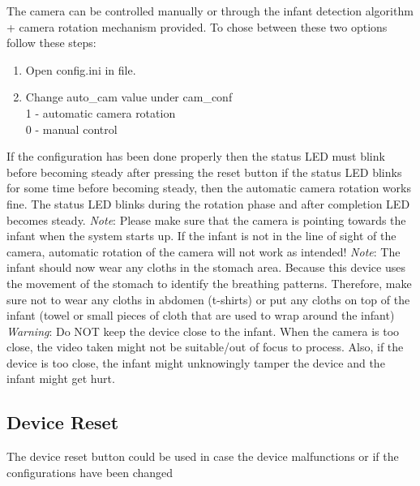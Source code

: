 \documentclass{report}
\begin{document}
The camera can be controlled manually or through the infant detection algorithm + camera rotation mechanism provided. To chose between these two options follow these steps:

\begin{enumerate}

  \item Open config.ini in file.
  \item Change auto\_cam value under cam\_conf \\
  1 - automatic camera rotation\\
  0 - manual control   %
  
\end{enumerate}

If the configuration has been done properly then the status LED must blink before becoming steady after pressing the reset button
if the status LED blinks for some time before becoming steady, then the automatic camera rotation works fine. The status LED blinks during the rotation phase and after completion LED becomes steady.
\newline
\newline
\emph{Note}: Please make sure that the camera is pointing towards the infant when the system starts up. If the infant is not in the line of sight of the camera, automatic rotation of the camera will not work as intended!
\newline
\newline
\emph{Note}: The infant should now wear any cloths in the stomach area. Because this device uses the movement of the stomach to identify the breathing patterns. Therefore, make sure not to wear any cloths in abdomen (t-shirts) or put any cloths on top of the infant (towel or small pieces of cloth that are used to wrap around the infant)
\newline
\newline
\emph{Warning}: Do NOT keep the device close to the infant. When the camera is too close, the video taken might not be suitable/out of focus to process. Also, if the device is too close, the infant might unknowingly tamper the device and the infant might get hurt.

\subsection{Device Reset}

The device reset button could be used in case the device malfunctions or if the configurations have been changed
\end{document}
